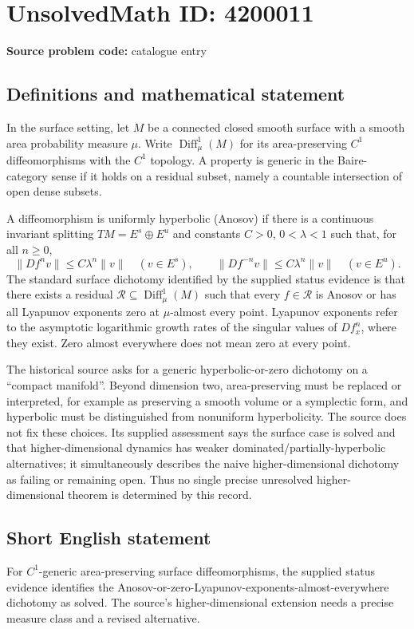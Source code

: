 \documentclass[11pt]{article}
\begin{document}
\section*{UnsolvedMath ID: 4200011}
\textbf{Source problem code:} catalogue entry
\subsection{Definitions and mathematical statement}
In the surface setting, let $M$ be a connected closed smooth surface with a smooth area probability measure $\mu$. Write $\operatorname{Diff}^1_\mu(M)$ for its area-preserving $C^1$ diffeomorphisms with the $C^1$ topology. A property is generic in the Baire-category sense if it holds on a residual subset, namely a countable intersection of open dense subsets.

A diffeomorphism is uniformly hyperbolic (Anosov) if there is a continuous invariant splitting $TM=E^s\oplus E^u$ and constants $C>0$, $0<\lambda<1$ such that, for all $n\geq0$,
\[
\|Df^n v\|\leq C\lambda^n\|v\|\quad(v\in E^s),\qquad
\|Df^{-n}v\|\leq C\lambda^n\|v\|\quad(v\in E^u).
\]
The standard surface dichotomy identified by the supplied status evidence is that there exists a residual $\mathcal R\subseteq\operatorname{Diff}^1_\mu(M)$ such that every $f\in\mathcal R$ is Anosov or has all Lyapunov exponents zero at $\mu$-almost every point. Lyapunov exponents refer to the asymptotic logarithmic growth rates of the singular values of $Df^n_x$, where they exist. Zero almost everywhere does not mean zero at every point.

The historical source asks for a generic hyperbolic-or-zero dichotomy on a ``compact manifold''. Beyond dimension two, area-preserving must be replaced or interpreted, for example as preserving a smooth volume or a symplectic form, and hyperbolic must be distinguished from nonuniform hyperbolicity. The source does not fix these choices. Its supplied assessment says the surface case is solved and that higher-dimensional dynamics has weaker dominated/partially-hyperbolic alternatives; it simultaneously describes the naive higher-dimensional dichotomy as failing or remaining open. Thus no single precise unresolved higher-dimensional theorem is determined by this record.
\subsection{Short English statement}
For $C^1$-generic area-preserving surface diffeomorphisms, the supplied status evidence identifies the Anosov-or-zero-Lyapunov-exponents-almost-everywhere dichotomy as solved. The source's higher-dimensional extension needs a precise measure class and a revised alternative.
\end{document}
